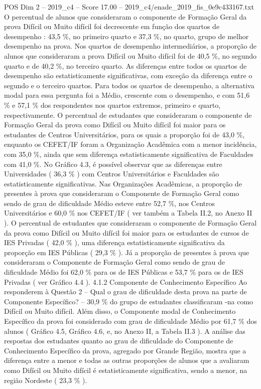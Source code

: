 \begin{textsample}{POS Dim 2 – 2019\_c4 – Score 17.00 – 2019\_c4/enade\_2019\_fis\_0e9c433167.txt}
O percentual de alunos que consideraram o componente de Formação Geral da prova Difícil ou Muito difícil foi decrescente em função dos quartos de desempenho : 43,5 \%, no primeiro quarto e 37,3 \%, no quarto, grupo de melhor desempenho na prova.
Nos quartos de desempenho intermediários, a proporção de alunos que consideraram a prova Difícil ou Muito difícil foi de 40,5 \%, no segundo quarto e de 40,2 \%, no terceiro quarto.
As diferenças entre todos os quartos de desempenho são estatisticamente significativas, com exceção da diferença entre o segundo e o terceiro quartos.
Para todos os quartos de desempenho, a alternativa modal para essa pergunta foi a Médio, crescente com o desempenho, e com 51,6 \% e 57,1 \% dos respondentes nos quartos extremos, primeiro e quarto, respectivamente.
O percentual de estudantes que consideraram o componente de Formação Geral da prova como Difícil ou Muito difícil foi maior para os estudantes de Centros Universitários, para os quais a proporção foi de 43,0 \%, enquanto os CEFET/IF foram a Organização Acadêmica com a menor incidência, com 35,0 \%, ainda que sem diferença estatisticamente significativa de Faculdades com 41,0 \%.
No Gráfico 4.3, é possível observar que as diferenças entre Universidades ( 36,3 \% ) com Centros Universitários e Faculdades são estatisticamente significativas.
Nas Organizações Acadêmicas, a proporção de presentes à prova que consideraram o Componente de Formação Geral como sendo de grau de dificuldade Médio esteve entre 52,7 \%, nos Centros Universitários e 60,0 \% nos CEFET/IF ( ver também a Tabela II.2, no Anexo II ).
O percentual de estudantes que consideraram o componente de Formação Geral da prova como Difícil ou Muito difícil foi maior para os estudantes de cursos de IES Privadas ( 42,0 \% ), uma diferença estatisticamente significativa da proporção em IES Públicas ( 29,3 \% ).
Já a proporção de presentes à prova que consideraram o Componente de Formação Geral como sendo de grau de dificuldade Médio foi 62,0 \% para os de IES Públicas e 53,7 \% para os de IES Privadas ( ver Gráfico 4.4 ). 4.1.2 Componente de Conhecimento Específico Ao responderem à Questão 2 – Qual o grau de dificuldade desta prova na parte de Componente Específico? – 30,9 \% do grupo de estudantes classificaram -na como Difícil ou Muito difícil.
Além disso, o Componente modal de Conhecimento Específico da prova foi considerado com grau de dificuldade Médio por 61,7 \% dos alunos ( Gráfico 4.5, Gráfico 4.6, e, no Anexo II, a Tabela II.3 ).
A análise das respostas dos estudantes quanto ao grau de dificuldade do Componente de Conhecimento Específico da prova, agregado por Grande Região, mostra que a diferença entre a menor e todas as outras proporções de alunos que a avaliaram como Difícil ou Muito difícil é estatisticamente significativa, sendo a menor, na região Nordeste ( 23,3 \% ).

\end{textsample}
